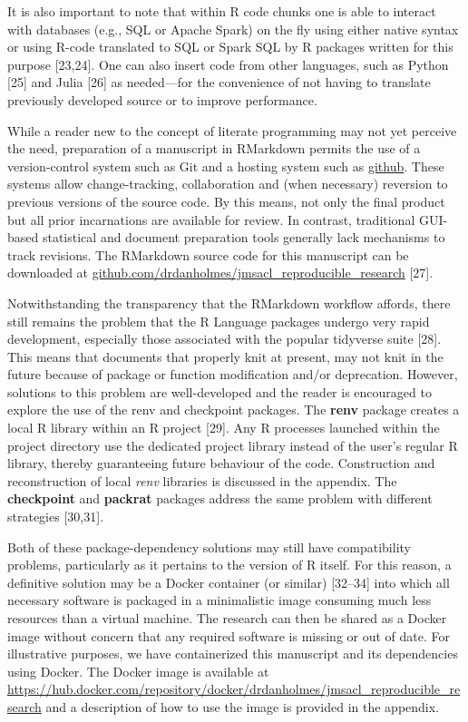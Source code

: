 \documentclass[]{elsarticle} %
\begin{document}
It is also important to note that within R code chunks one is able to
interact with databases (e.g., SQL or Apache Spark) on the fly using
either native syntax or using R-code translated to SQL or Spark SQL by R
packages written for this purpose {[}23,24{]}. One can also insert code
from other languages, such as Python {[}25{]} and Julia {[}26{]} as
needed---for the convenience of not having to translate previously
developed source or to improve performance.

While a reader new to the concept of literate programming may not yet
perceive the need, preparation of a manuscript in RMarkdown permits the
use of a version-control system such as Git and a hosting system such as
\href{https://github.com/}{github}. These systems allow change-tracking,
collaboration and (when necessary) reversion to previous versions of the
source code. By this means, not only the final product but all prior
incarnations are available for review. In contrast, traditional
GUI-based statistical and document preparation tools generally lack
mechanisms to track revisions. The RMarkdown source code for this
manuscript can be downloaded at
\href{https://github.com/drdanholmes/jmsacl_reproducible_research}{github.com/drdanholmes/jmsacl\_reproducible\_research}
{[}27{]}.

Notwithstanding the transparency that the RMarkdown workflow affords,
there still remains the problem that the R Language packages undergo
very rapid development, especially those associated with the popular
tidyverse suite {[}28{]}. This means that documents that properly knit
at present, may not knit in the future because of package or function
modification and/or deprecation. However, solutions to this problem are
well-developed and the reader is encouraged to explore the use of the
renv and checkpoint packages. The \textbf{renv} package creates a local
R library within an R project {[}29{]}. Any R processes launched within
the project directory use the dedicated project library instead of the
user's regular R library, thereby guaranteeing future behaviour of the
code. Construction and reconstruction of local \emph{renv} libraries is
discussed in the appendix. The \textbf{checkpoint} and \textbf{packrat}
packages address the same problem with different strategies {[}30,31{]}.

Both of these package-dependency solutions may still have compatibility
problems, particularly as it pertains to the version of R itself. For
this reason, a definitive solution may be a Docker container (or
similar) {[}32--34{]} into which all necessary software is packaged in a
minimalistic image consuming much less resources than a virtual machine.
The research can then be shared as a Docker image without concern that
any required software is missing or out of date. For illustrative
purposes, we have containerized this manuscript and its dependencies
using Docker. The Docker image is available at
\url{https://hub.docker.com/repository/docker/drdanholmes/jmsacl_reproducible_research}
and a description of how to use the image is provided in the appendix.
\end{document}
